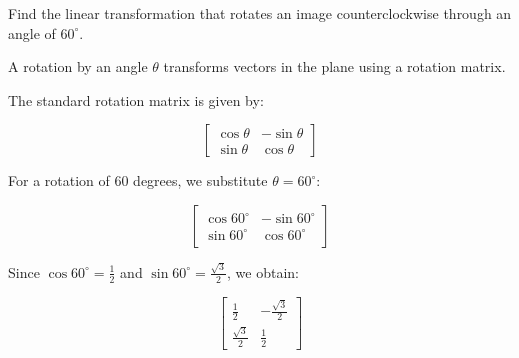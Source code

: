 \documentclass{ximera}
\begin{document}
        \begin{problem}
Find the linear transformation that rotates an image counterclockwise through an angle of $60^\circ$.

    \vspace{0.3cm}

    A rotation by an angle $\theta$ transforms vectors in the plane using a rotation matrix.

     The standard rotation matrix is given by:

\[
\begin{bmatrix}
\cos\theta & -\sin\theta \\
\sin\theta & \cos\theta
\end{bmatrix}
\]

\vspace{0.3cm}

For a rotation of 60 degrees, we substitute $\theta = 60^\circ$:

\[
\begin{bmatrix}
\cos 60^\circ & -\sin 60^\circ \\
\sin 60^\circ & \cos 60^\circ
\end{bmatrix}
\]

\vspace{0.3cm}

Since $\cos 60^\circ = \frac{1}{2}$ and $\sin 60^\circ = \frac{\sqrt{3}}{2}$, we obtain:

\[
\begin{bmatrix}
\frac{1}{2} & -\frac{\sqrt{3}}{2} \\
\frac{\sqrt{3}}{2} & \frac{1}{2}
\end{bmatrix}
\]

\end{problem}

       \vspace{0.5cm}
\end{document}
